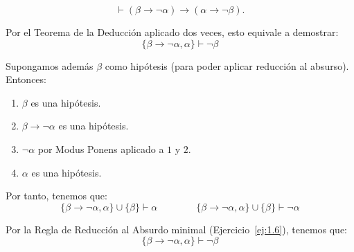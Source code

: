 \begin{ejercicio}\label{ej:1.12}
    $$\vdash (\beta \rightarrow \neg\alpha) \rightarrow (\alpha \rightarrow \neg\beta).$$
    
    Por el Teorema de la Deducción aplicado dos veces, esto equivale a demostrar:
    \begin{equation*}
        \{\beta\rightarrow\neg\alpha,\alpha\} \vdash \neg\beta
    \end{equation*}
    
    Supongamos además $\beta$ como hipótesis (para poder aplicar reducción al absurso). Entonces:
    \begin{enumerate}
        \item $\beta$ es una hipótesis.
        \item $\beta\rightarrow \neg\alpha$ es una hipótesis.
        \item $\neg\alpha$ por Modus Ponens aplicado a $1$ y $2$.
        \item $\alpha$ es una hipótesis.
    \end{enumerate}

    Por tanto, tenemos que:
    \begin{equation*}
        \{\beta\rightarrow\neg\alpha,\alpha\}\cup \{\beta\} \vdash \alpha\qquad\qquad\{\beta\rightarrow\neg\alpha,\alpha\}\cup \{\beta\} \vdash \neg\alpha
    \end{equation*}

    Por la Regla de Reducción al Absurdo minimal (Ejercicio~\ref{ej:1.6}), tenemos que:
    \begin{equation*}
        \{\beta\rightarrow\neg\alpha,\alpha\} \vdash \neg\beta
    \end{equation*}
\end{ejercicio}

